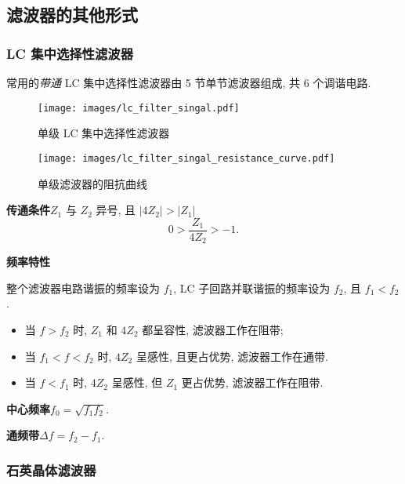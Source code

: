 \subsection{滤波器的其他形式} \label{滤波器的其他形式}
\subsubsection{LC 集中选择性滤波器}

常用的\textit{带通} LC 集中选择性滤波器由 5 节单节滤波器组成, 共 6 个调谐电路.

\begin{figure}[H]
    \centering
    \begin{minipage}{.48\textwidth}
        \centering
        \texttt{[image: images/lc\_filter\_singal.pdf]}
        \caption{单级 LC 集中选择性滤波器}
    \end{minipage}\quad
    \begin{minipage}{.358\textwidth}
        \centering
        \texttt{[image: images/lc\_filter\_singal\_resistance\_curve.pdf]}
        \caption{单级滤波器的阻抗曲线}
    \end{minipage}
\end{figure}

\textbf{传通条件}\quad $Z_1$ 与 $Z_2$ 异号, 且 $|4Z_2|>|Z_1|$
\begin{equation}
    0>\frac{Z_1}{4Z_2}>-1.
\end{equation}

\textbf{频率特性}

整个滤波器电路谐振的频率设为 $f_1$, LC 子回路并联谐振的频率设为 $f_2$, 且 $f_1<f_2$.

\begin{itemize}
    \item 当 $f>f_2$ 时, $Z_1$ 和 $4Z_2$ 都呈容性, 滤波器工作在阻带;
    \item 当 $f_1<f<f_2$ 时, $4Z_2$ 呈感性, 且更占优势, 滤波器工作在通带.
    \item 当 $f<f_1$ 时, $4Z_2$ 呈感性, 但 $Z_1$ 更占优势, 滤波器工作在阻带.
\end{itemize}

\textbf{中心频率}\quad $f_0=\sqrt{f_1f_2}$.

\textbf{通频带}\quad $\Delta f=f_2-f_1.$

\subsubsection{石英晶体滤波器} \label{石英晶体滤波器}

